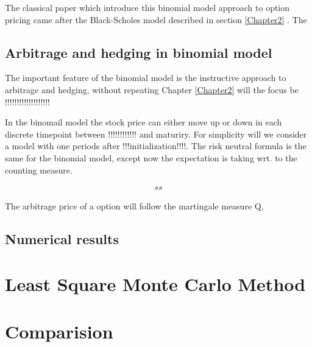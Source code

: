 The classical paper \parencite{binomial-Paper} which introduce this binomial model approach to option pricing came after the Black-Scholes model described in section \ref{Chapter2} \parencite{B-S-Paper}. The 



\subsection{Arbitrage and hedging in binomial model}
The important feature of the binomial model is the instructive approach to arbitrage and hedging, without repeating Chapter \ref{Chapter2} will the focus be !!!!!!!!!!!!!!!!!!!

In the binomail model the stock price can either move up or down in each discrete timepoint between !!!!!!!!!!!! and maturiry. For simplicity will we consider a model with one periods after !!!initialization!!!!. The risk neutral formula is the same for the binomial model, except now the expectation is taking wrt. to the counting measure.

\begin{align*}
ss
\end{align*}

The arbitrage price of a option will follow the martingale measure Q, 



\subsection{Numerical results}


\section{Least Square Monte Carlo Method}


\section{Comparision}

